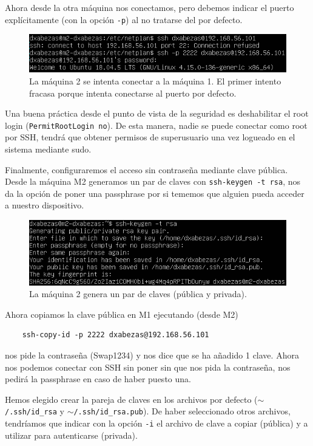 \documentclass{article}
\begin{document}
Ahora desde la otra máquina
nos conectamos, pero debemos indicar el puerto explícitamente (con la opción \texttt{-p}) al no tratarse del por defecto.

\begin{figure}[H]
	\centering
	\includegraphics[width=140mm]{imgs/ssh-port}
	\caption{La máquina 2 se intenta conectar a la máquina 1. El primer intento fracasa porque intenta conectarse al puerto por defecto.}
	\label{fig:ssh-port}
\end{figure}

Una buena práctica desde el punto de vista de la seguridad es deshabilitar el root login (\texttt{PermitRootLogin no}). De esta manera,
nadie se puede conectar como root por SSH, tendrá que obtener permisos de superusuario una vez logueado en el sistema mediante sudo.

Finalmente, configuraremos el acceso sin contraseña mediante clave pública. Desde la máquina M2 generamos un par de claves con
\texttt{ssh-keygen -t rsa}, nos da la opción de poner una passphrase por si tememos que alguien pueda acceder a nuestro dispositivo.

\begin{figure}[H]
	\centering
	\includegraphics[width=140mm]{imgs/keygen}
	\caption{La máquina 2 genera un par de claves (pública y privada).}
	\label{fig:keygen}
\end{figure}

Ahora copiamos la clave pública en M1 ejecutando (desde M2)
\begin{verbatim}
	ssh-copy-id -p 2222 dxabezas@192.168.56.101
\end{verbatim}

nos pide la contraseña (Swap1234) y nos dice que se ha añadido 1 clave. Ahora nos podemos conectar con SSH sin poner sin que nos pida
la contraseña, nos pedirá la passphrase en caso de haber puesto una.

Hemos elegido crear la pareja de claves en los archivos por defecto (\texttt{$\mathtt{\sim}$/.ssh/id\_rsa} y
 \texttt{$\mathtt{\sim}$/.ssh/id\_rsa.pub}). De haber
seleccionado otros archivos, tendríamos que indicar con la opción \texttt{-i} el archivo de clave a copiar (pública) y a utilizar
para autenticarse (privada).
\end{document}

